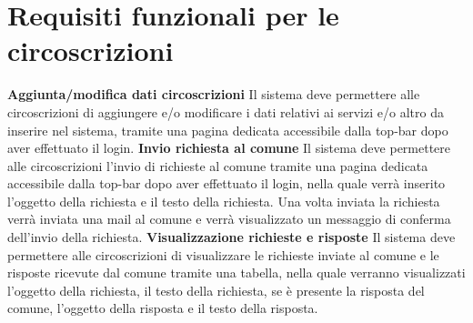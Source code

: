     \section{Requisiti funzionali per le circoscrizioni}
        \begin{rfList}
            \rfItem \textbf{Aggiunta/modifica dati circoscrizioni} Il sistema deve permettere alle circoscrizioni di aggiungere e/o modificare i dati relativi ai servizi e/o altro da inserire nel sistema, tramite una pagina dedicata accessibile dalla top-bar dopo aver effettuato il login.
            \rfItem \textbf{Invio richiesta al comune} Il sistema deve permettere alle circoscrizioni l'invio di richieste al comune tramite una pagina dedicata accessibile dalla top-bar dopo aver effettuato il login, nella quale verrà inserito l'oggetto della richiesta e il testo della richiesta. Una volta inviata la richiesta verrà inviata una mail al comune e verrà visualizzato un messaggio di conferma dell'invio della richiesta.
            \rfItem \textbf{Visualizzazione richieste e risposte} Il sistema deve permettere alle circoscrizioni di visualizzare le richieste inviate al comune e le risposte ricevute dal comune tramite una tabella, nella quale verranno visualizzati l'oggetto della richiesta, il testo della richiesta, se è presente la risposta del comune, l'oggetto della risposta e il testo della risposta.
        \end{rfList}